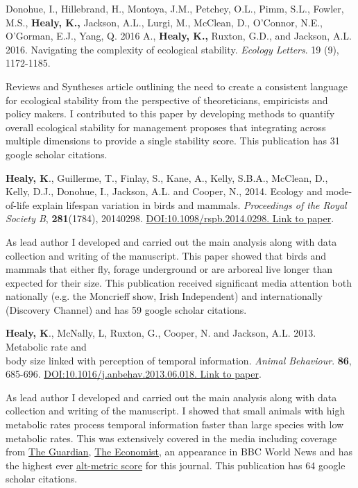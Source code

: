 \documentclass[10pt,a4paper]{article}
\begin{document}
\begin{flushleft}
\bigskip

\setlength{\parindent}{0mm}Donohue, I., Hillebrand, H., Montoya, J.M., Petchey, O.L., Pimm, S.L., Fowler, M.S., \textbf{Healy, K.,} Jackson, A.L., Lurgi, M., McClean, D., O'Connor, N.E., O'Gorman, E.J., Yang, Q. 2016
 A., \textbf{Healy, K.,} Ruxton, G.D., and Jackson, A.L. 2016. Navigating the complexity of ecological stability. \textit{Ecology Letters}. 19 (9), 1172-1185.
\smallskip
\par{\fontsize{10.5}{10} Reviews and Syntheses article outlining the need to create a consistent language for ecological stability from the perspective of theoreticians, empiricists and policy makers. I contributed to this paper by developing methods to quantify overall ecological stability for management proposes that integrating across multiple dimensions to provide a single stability score. This publication has 31 google scholar citations.}

\bigskip

\textbf{Healy, K}., Guillerme, T., Finlay, S., Kane, A., Kelly, S.B.A., McClean, D., Kelly, D.J., Donohue, I., Jackson, A.L. and Cooper, N., 2014. Ecology and mode-of-life explain lifespan variation in birds and mammals. \textit{Proceedings of the Royal Society B}, \textbf{281}(1784), 20140298. \href{http://rspb.royalsocietypublishing.org/content/281/1784/20140298}{DOI:10.1098/rspb.2014.0298. Link to paper}.
\smallskip
\par{\fontsize{10.5}{10} As lead author I developed and carried out the main analysis along with data collection and writing of the manuscript. This paper showed that birds and mammals that either fly, forage underground or are arboreal live longer than expected for their size. This publication received significant media attention both nationally (e.g. the Moncrieff show, Irish Independent) and internationally (Discovery Channel) and has 59 google scholar citations.}

\bigskip

\textbf{Healy, K}., McNally, L, Ruxton, G., Cooper, N. and Jackson, A.L. 2013. Metabolic rate and\\
body size linked with perception of temporal information.  \textit{Animal Behaviour}. \textbf{86}, 685-696. \href{http://dx.doi.org/10.1016/j.anbehav.2013.06.018}{DOI:10.1016/j.anbehav.2013.06.018. Link to paper}.
\smallskip
\par{\fontsize{10.5}{10} As lead author I developed and carried out the main analysis along with data collection and writing of the manuscript. I showed that small animals with high metabolic rates process temporal information faster than large species with low metabolic rates. This was extensively covered in the media including coverage from 
\href{https://www.theguardian.com/science/2013/sep/16/time-passes-slowly-flies-study}{The Guardian}, 
\href{http://www.economist.com/news/science-and-technology/21586532-small-creatures-fast-metabolisms-see-world-action-replay-slo-mo}{The Economist},
 an appearance in BBC World News and has the highest ever \href{http://www.altmetric.com/details.php?key=517059da36b98ab7d4941284da32e5f7&citation_id=1705703&embedded=true}{alt-metric score} for this journal. This publication has 64 google scholar citations.} 


\end{flushleft}
\end{document}
